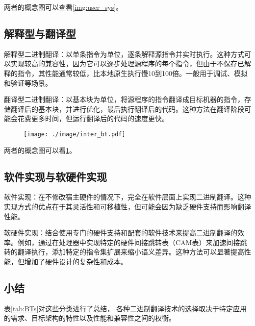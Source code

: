 两者的概念图可以查看\ref{img:user_sys}。

\subsection{解释型与翻译型}
解释型二进制翻译：以单条指令为单位，逐条解释源指令并实时执行。这种方式可以实现较高的兼容性，因为它可以逐步处理源程序的每个指令，但由于不保存已解释的指令，其性能通常较低，比本地原生执行慢10到100倍。一般用于调试、模拟和验证等场景。

翻译型二进制翻译：以基本块为单位，将源程序的指令翻译成目标机器的指令，存储翻译后的基本块，并进行优化，最后执行翻译后的代码。这种方法在翻译阶段可能会花费更多时间，但运行翻译后的代码的速度更快。

\begin{figure}[h]
  \centering
  \texttt{[image: ./image/inter\_bt.pdf]}
  \label{img:inter_bt}
\end{figure}

两者的概念图可以看\ref{img:inter_bt}。

\subsection{软件实现与软硬件实现}
软件实现：在不修改宿主硬件的情况下，完全在软件层面上实现二进制翻译。这种实现方式的优点在于其灵活性和可移植性，但可能会因为缺乏硬件支持而影响翻译性能。

软硬件实现：结合使用专门的硬件支持和配套的软件技术来提高二进制翻译的效率。例如，通过在处理器中实现特定的硬件间接跳转表（CAM表）来加速间接跳转的翻译执行\cite{Godson3}，添加特定的指令集扩展来缩小语义差异。这种方法可以显著提高性能，但增加了硬件设计的复杂性和成本。

\subsection{小结}

表\ref{tab:BTs}对这些分类进行了总结，
各种二进制翻译技术的选择取决于特定应用的需求、目标架构的特性以及性能和兼容性之间的权衡。

